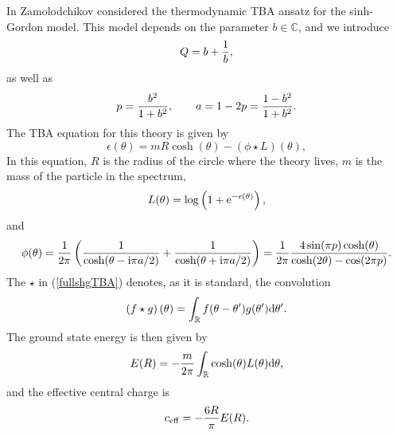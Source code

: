 \documentclass[a4paper,11pt]{article}
\theoremstyle{definition}
\def\IR{{\mathbb R}}
\def\IC{{\mathbb C}}
\newcommand{\re}{{\rm e}}
\newcommand{\ri}{{\rm i}}
\newcommand{\rd}{{\rm d}}
\newcommand{\be}{\begin{equation}}
\newcommand{\ee}{\end{equation}}
\def\IC{\mathbb{C}}
\def\IR{\mathbb{R}}
\begin{document}
In \cite{zamo-sg} Zamolodchikov considered the thermodynamic TBA
ansatz for the sinh-Gordon model. This model depends on the
parameter $b\in\IC$, and we introduce
%
\begin{equation}
  Q=b+{1\over b}, 
\end{equation}
%
as well as 
%
\begin{equation}
  \label{parameters}
  p= {b^2\over 1+ b^2}, \qquad  a=1-2p={1-b^2 \over 1+b^2}. 
\end{equation}
%
The TBA equation for this theory is given by 
%
\begin{equation}
\label{fullshgTBA}
  \epsilon (\theta)=m R \cosh(\theta)-\left( \phi\star L \right)(\theta), 
\end{equation}
%
In this equation, $R$ is the radius of the circle where the theory lives, $m$ is the mass of the particle in the spectrum,
%
\begin{equation}
  L(\theta) = \log\left(1+ \re^{-\epsilon(\theta)}\right),
\end{equation}
%
and
%
\begin{equation}
\label{sh-kernel}
  \phi(\theta)= {1\over 2 \pi} \left( {1\over\cosh(\theta-\ri \pi
      a/2)} +  {1\over\cosh(\theta+\ri \pi a/2)}  \right)= {1\over 2
    \pi} {4 \sin (\pi p) \cosh(\theta) \over  
    \cosh(2 \theta) - \cos(2 \pi p)}. 
\end{equation}
%
The $\star$ in (\ref{fullshgTBA}) denotes, as it is standard, the convolution
%
\be
\left(f\star g \right)(\theta)= \int_\IR f(\theta-\theta') g(\theta') \rd \theta'. 
\ee
%
The ground state energy is then given by
%
\begin{equation}
  E(R)= -{m \over 2 \pi} \int_\IR \cosh(\theta) L(\theta) \rd \theta, 
\end{equation}
%
and the effective central charge is 
%
\begin{equation}
  c_{\rm eff}=-{6 R \over \pi} E(R). 
\end{equation}
%
\end{document}
